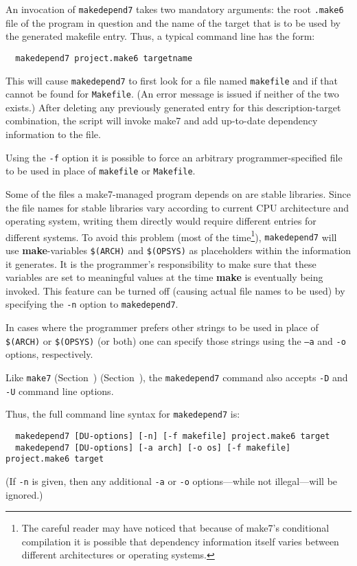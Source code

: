 An invocation of {\tt makedepend7} takes two mandatory arguments:
the root {\tt .make6} file of the program in question and the name
of the target that is to be used by the generated makefile entry.
Thus, a typical command line has the form:

\begin{verbatim}
  makedepend7 project.make6 targetname
\end{verbatim}

This will cause {\tt makedepend7} to first look for a file named
{\tt makefile} and if that cannot be found for {\tt Makefile}.  (An
error message is issued if neither of the two exists.)  After deleting
any previously generated entry for this description-target
combination, the script will invoke make7 and add up-to-date dependency
information to the file.

Using the {\tt -f} option it is possible to force an arbitrary
programmer-specified file to be used in place of {\tt makefile} or
{\tt Makefile}.

Some of the files a make7-managed program depends on are stable
libraries.  Since the file names for stable libraries vary according
to current CPU architecture and operating system, writing them
directly would require different entries for different systems.  To
avoid this problem (most of the time\footnote{The careful reader may
have noticed that because of make7's conditional compilation it is
possible that dependency information itself varies between different
architectures or operating systems.}), {\tt makedepend7} will use
{\bf make}-variables {\tt \$(ARCH)} and {\tt \$(OPSYS)} as
placeholders within the information it generates.  It is the
programmer's responsibility to make sure that these variables are set
to meaningful values at the time {\bf make} is eventually being
invoked.  This feature can be turned off (causing actual file names to
be used) by specifying the {\tt -n} option to {\tt makedepend7}.

In cases where the programmer prefers other strings to be used in
place of {\tt \$(ARCH)} or {\tt \$(OPSYS)} (or both) one can specify
those strings using the {\tt --a} and {\tt -o} options, respectively.

Like {\tt make7} (Section~)
(Section~), the {\tt makedepend7} command
also accepts {\tt -D} and {\tt -U} command line options.

Thus, the full command line syntax for {\tt makedepend7} is:

\begin{verbatim}
  makedepend7 [DU-options] [-n] [-f makefile] project.make6 target
  makedepend7 [DU-options] [-a arch] [-o os] [-f makefile] project.make6 target
\end{verbatim}

(If {\tt -n} is given, then any additional {\tt -a} or {\tt -o}
options---while not illegal---will be ignored.)
